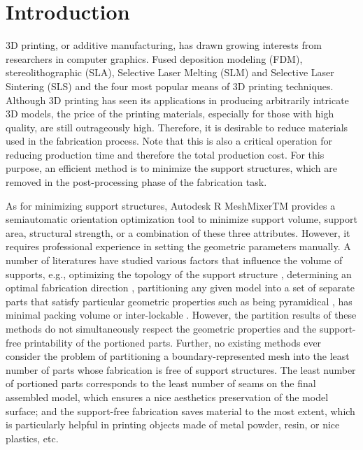 \section{Introduction}

3D printing, or additive manufacturing, has drawn growing interests from researchers in computer graphics. Fused deposition modeling (FDM), stereolithographic (SLA), Selective Laser Melting (SLM) and Selective Laser Sintering (SLS) and the four most popular means of 3D printing techniques. Although 3D printing has seen its applications in producing arbitrarily intricate 3D models, the price of the printing materials, especially for those with high quality, are still outrageously high. Therefore, it is desirable to reduce materials used in the fabrication process. Note that this is also a critical operation for reducing production time and therefore the total production cost. For this purpose, an efficient method is to minimize the support structures, which are removed in the post-processing phase of the fabrication task.

As for minimizing support structures, Autodesk R MeshMixerTM provides a semiautomatic orientation optimization tool to minimize support volume, support area, structural strength, or a combination of these three attributes. However, it requires professional experience in setting the geometric parameters manually. A number of literatures have studied various factors that influence the volume of supports, e.g., optimizing the topology of the support structure \cite{DumasHL14,VanekGB14}, determining an optimal fabrication direction \cite{Zhang:2015,HildebrandBA13,padhye2011multi}, partitioning any given model into a set of separate parts that satisfy particular geometric properties such as being pyramidical \cite{Hu_siga14}, has minimal packing volume \cite{VanekGBMCSM14} or inter-lockable \cite{SongFLF15}. However, the partition results of these methods do not simultaneously respect the geometric properties and the support-free printability of the portioned parts. Further, no existing methods ever consider the problem of partitioning a boundary-represented mesh into the least number of parts whose fabrication is free of support structures. The least number of portioned parts corresponds to the least number of seams on the final assembled model, which ensures a nice aesthetics preservation of the model surface; and the support-free fabrication saves material to the most extent, which is particularly helpful in printing objects made of metal powder, resin, or nice plastics, etc.

